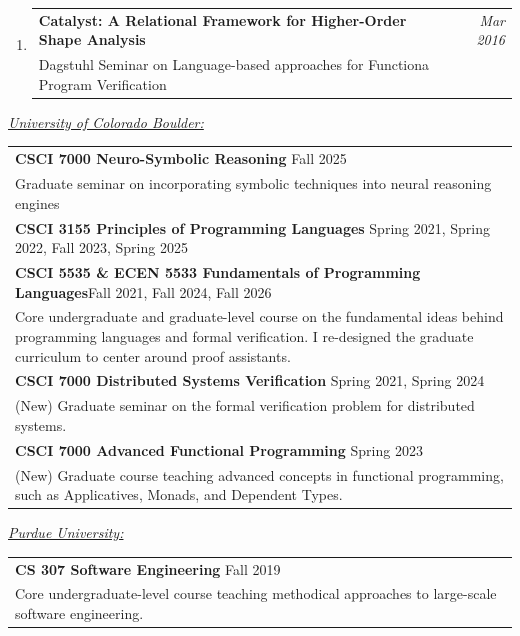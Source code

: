 \documentclass{article}
\makeatletter
\newenvironment{benumerate}[2]{
    \let\oldItem\item
    \def\item{\addtocounter{enumi}{-2}\oldItem}
    \begin{enumerate}[#2] \itemsep3pt
    \setcounter{enumi}{#1}
    \addtocounter{enumi}{1}}
  {\end{enumerate}}
\newenvironment{region}[3]{%
  {{\textbf{#1}}}
  \begin{benumerate}{#3}{\color{RoyalBlue}#2}}
  {\end{benumerate}\vspace{0.8ex}}
\newenvironment{nonumregion}[1]{%
\begin{region}{#1}{}{1}}
{\end{region}}
\newenvironment{talk}[4]
{ \item
  \begin{tabular*}{6.8in}{l@{\extracolsep{\fill}}r}
    \textbf{#1} & \textit{#2} \\
    \hspace{1ex} #3 & \small{#4}
\end{tabular*}
} {}
\makeatother
\begin{document}
\begin{nonumregion}{}
\begin{talk} 
  {Catalyst: A Relational Framework for Higher-Order Shape Analysis} 
  {Mar 2016} {Dagstuhl Seminar on Language-based approaches for Functiona
  Program Verification}{}
\end{talk}

\end{nonumregion}


\vspace{1em}
\noindent \underline{{\em University of Colorado Boulder:}}
\begin{center}
  \begin{tabular}{ p{16.5cm}}
%
{\bf CSCI 7000 Neuro-Symbolic Reasoning} \hfill Fall 2025\\[3pt]
\hspace{2em} Graduate seminar on incorporating symbolic techniques into neural
    reasoning engines \\ [7pt] 
%
{\bf CSCI 3155 Principles of Programming Languages} \hfill
Spring 2021, Spring 2022, Fall 2023, Spring 2025 \\[3pt]
%
{\bf CSCI 5535 \& ECEN 5533 Fundamentals of Programming Languages}\hfill Fall
2021, Fall 2024, Fall 2026 \\[3pt]
\hspace{2em}  Core undergraduate and graduate-level course on the
fundamental ideas behind programming languages and formal verification. I
re-designed the graduate curriculum to center around proof assistants.\\ [7pt]
%
{\bf CSCI 7000 Distributed Systems Verification} \hfill Spring 2021, Spring
2024 \\[3pt]
\hspace{2em} (New) Graduate seminar on the formal verification problem for
distributed systems. \\ [7pt] 
%
{\bf CSCI 7000 Advanced Functional Programming} \hfill Spring 2023\\[3pt]
\hspace{2em} (New) Graduate course teaching advanced concepts in functional
programming, such as Applicatives, Monads, and Dependent Types. \\ [7pt] 
\end{tabular}
\end{center}
\vspace{0.3em}
\noindent \underline{\em Purdue University:}
\begin{center}
  \begin{tabular}{ p{16.5cm}}
{\bf CS 307 Software Engineering} \hfill Fall 2019 \\[3pt]
\hspace{2em}  Core undergraduate-level course teaching methodical
approaches to large-scale software engineering.  \\ [6pt]
  \end{tabular}
\end{center}
\end{document}
